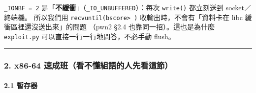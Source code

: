 \documentclass[10pt,a4paper]{article}
\begin{document}
\texttt{\_\allowbreak{}IONBF\ \allowbreak{}=\ \allowbreak{}2}
是「\textbf{不緩衝}」（\texttt{\_\allowbreak{}IO\_\allowbreak{}UNBUFFERED}）：每次
\texttt{write()} 都立刻送到 socket／終端機。 所以我們用
\texttt{recvuntil(b\textquotesingle{}\allowbreak{}score\textgreater{}\allowbreak{}\ \allowbreak{}\textquotesingle{}\allowbreak{})}
收輸出時，不會有「資料卡在 libc 緩衝區裡還沒送出來」的問題 （pwn2 §2.4
也靠同一招）。這也是為什麼 \texttt{exploit.\allowbreak{}py}
可以直接一行一行地問答，不必手動 flush。

\begin{center}\rule{0.5\linewidth}{0.5pt}\end{center}

\subsubsection{2. x86-64
速成班（看不懂組語的人先看這節）}\label{x86-64-ux901fux6210ux73edux770bux4e0dux61c2ux7d44ux8a9eux7684ux4ebaux5148ux770bux9019ux7bc0}

\paragraph{2.1 暫存器}\label{ux66abux5b58ux5668-2}
\end{document}

